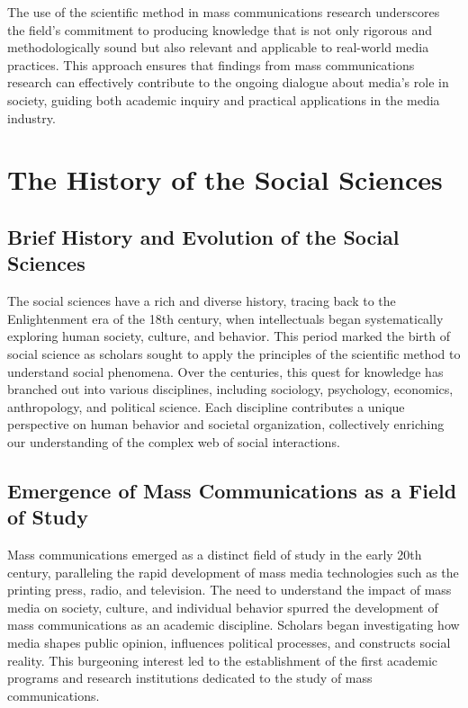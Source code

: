 \documentclass[
]{book}
\begin{document}
The use of the scientific method in mass communications research underscores the field's commitment to producing knowledge that is not only rigorous and methodologically sound but also relevant and applicable to real-world media practices. This approach ensures that findings from mass communications research can effectively contribute to the ongoing dialogue about media's role in society, guiding both academic inquiry and practical applications in the media industry.

\hypertarget{the-history-of-the-social-sciences}{%
\section{The History of the Social Sciences}\label{the-history-of-the-social-sciences}}

\hypertarget{brief-history-and-evolution-of-the-social-sciences}{%
\subsection*{Brief History and Evolution of the Social Sciences}\label{brief-history-and-evolution-of-the-social-sciences}}

The social sciences have a rich and diverse history, tracing back to the Enlightenment era of the 18th century, when intellectuals began systematically exploring human society, culture, and behavior. This period marked the birth of social science as scholars sought to apply the principles of the scientific method to understand social phenomena. Over the centuries, this quest for knowledge has branched out into various disciplines, including sociology, psychology, economics, anthropology, and political science. Each discipline contributes a unique perspective on human behavior and societal organization, collectively enriching our understanding of the complex web of social interactions.

\hypertarget{emergence-of-mass-communications-as-a-field-of-study}{%
\subsection*{Emergence of Mass Communications as a Field of Study}\label{emergence-of-mass-communications-as-a-field-of-study}}

Mass communications emerged as a distinct field of study in the early 20th century, paralleling the rapid development of mass media technologies such as the printing press, radio, and television. The need to understand the impact of mass media on society, culture, and individual behavior spurred the development of mass communications as an academic discipline. Scholars began investigating how media shapes public opinion, influences political processes, and constructs social reality. This burgeoning interest led to the establishment of the first academic programs and research institutions dedicated to the study of mass communications.
\end{document}
